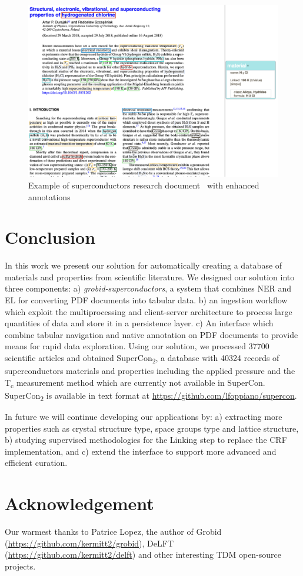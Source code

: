 \documentclass{article}
\begin{document}
\begin{figure}[ht]
\centering
\includegraphics[width=\textwidth]{sample-pdf-annotations}
\caption{\label{fig:pdf-annotations} Example of superconductors research document~\cite{sample_superconductors_article} with enhanced annotations}
\end{figure}

\section{Conclusion}
\label{sec:conclusion}
In this work we present our solution for automatically creating a database of materials and properties from scientific literature. 
We designed our solution into three components: a) \textit{grobid-superconductors}, a system that combines NER and EL for converting PDF documents into tabular data. b) an ingestion workflow which exploit the multiprocessing and client-server architecture to process large quantities of data and store it in a persistence layer. c) An interface which combine tabular navigation and native annotation on PDF documents to provide means for rapid data exploration. 
Using our solution, we processed 37700 scientific articles and obtained SuperCon\textsubscript{2}, a database with 40324 records of superconductors materials and properties including the applied pressure and the T\textsubscript{c} measurement method which are currently not available in SuperCon. 
SuperCon\textsubscript{2} is available in text format at \url{https://github.com/lfoppiano/supercon}.

In future we will continue developing our applications by: a) extracting more properties such as crystal structure type, space groups type and lattice structure, b) studying supervised methodologies for the Linking step to replace the CRF implementation, and c) extend the interface to support more advanced and efficient curation.


\section{Acknowledgement}
\label{sec:acknowledgement}
Our warmest thanks to Patrice Lopez, the author of Grobid (\url{https://github.com/kermitt2/grobid}), DeLFT (\url{https://github.com/kermitt2/delft}) and other interesting TDM open-source projects.



\end{document}
